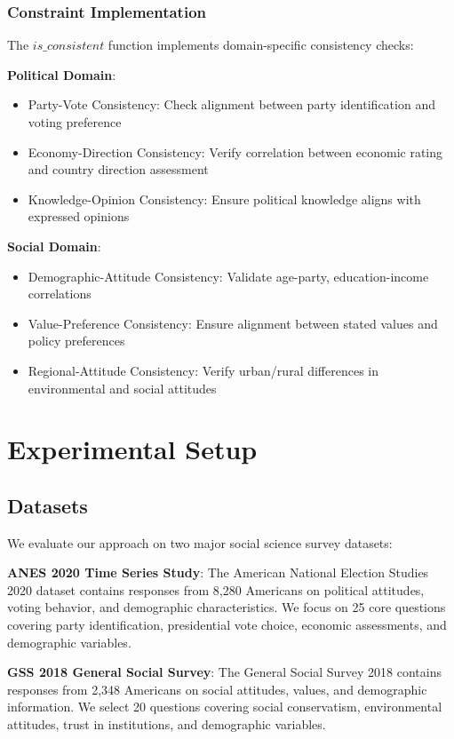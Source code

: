 \documentclass[sigconf, anonymous]{acmart}
\begin{document}
\subsubsection{Constraint Implementation}

The $is\_consistent$ function implements domain-specific consistency checks:

\textbf{Political Domain}:
\begin{itemize}
    \item Party-Vote Consistency: Check alignment between party identification and voting preference
    \item Economy-Direction Consistency: Verify correlation between economic rating and country direction assessment
    \item Knowledge-Opinion Consistency: Ensure political knowledge aligns with expressed opinions
\end{itemize}

\textbf{Social Domain}:
\begin{itemize}
    \item Demographic-Attitude Consistency: Validate age-party, education-income correlations
    \item Value-Preference Consistency: Ensure alignment between stated values and policy preferences
    \item Regional-Attitude Consistency: Verify urban/rural differences in environmental and social attitudes
\end{itemize}

\section{Experimental Setup}

\subsection{Datasets}

We evaluate our approach on two major social science survey datasets:

\textbf{ANES 2020 Time Series Study}: The American National Election Studies 2020 dataset contains responses from 8,280 Americans on political attitudes, voting behavior, and demographic characteristics. We focus on 25 core questions covering party identification, presidential vote choice, economic assessments, and demographic variables.

\textbf{GSS 2018 General Social Survey}: The General Social Survey 2018 contains responses from 2,348 Americans on social attitudes, values, and demographic information. We select 20 questions covering social conservatism, environmental attitudes, trust in institutions, and demographic variables.
\end{document}

